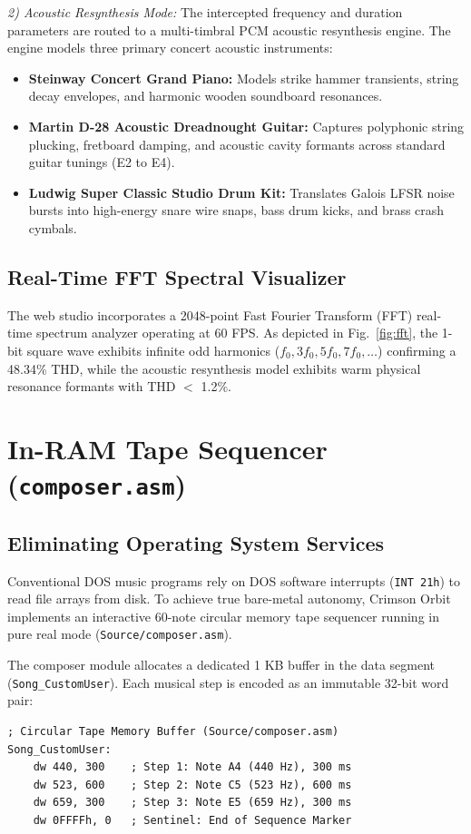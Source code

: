 \documentclass[conference]{IEEEtran}
\begin{document}
\textit{2) Acoustic Resynthesis Mode:} The intercepted frequency and duration parameters are routed to a multi-timbral PCM acoustic resynthesis engine. The engine models three primary concert acoustic instruments:
\begin{itemize}
\item \textbf{Steinway Concert Grand Piano:} Models strike hammer transients, string decay envelopes, and harmonic wooden soundboard resonances.
\item \textbf{Martin D-28 Acoustic Dreadnought Guitar:} Captures polyphonic string plucking, fretboard damping, and acoustic cavity formants across standard guitar tunings (E2 to E4).
\item \textbf{Ludwig Super Classic Studio Drum Kit:} Translates Galois LFSR noise bursts into high-energy snare wire snaps, bass drum kicks, and brass crash cymbals.
\end{itemize}

\subsection{Real-Time FFT Spectral Visualizer}
The web studio incorporates a 2048-point Fast Fourier Transform (FFT) real-time spectrum analyzer operating at 60 FPS. As depicted in Fig.~\ref{fig:fft}, the 1-bit square wave exhibits infinite odd harmonics ($f_0, 3f_0, 5f_0, 7f_0, \dots$) confirming a 48.34\% THD, while the acoustic resynthesis model exhibits warm physical resonance formants with THD $<$ 1.2\%.

\section{In-RAM Tape Sequencer (\texttt{composer.asm})}

\subsection{Eliminating Operating System Services}
Conventional DOS music programs rely on DOS software interrupts (\texttt{INT 21h}) to read file arrays from disk. To achieve true bare-metal autonomy, Crimson Orbit implements an interactive 60-note circular memory tape sequencer running in pure real mode (\texttt{Source/composer.asm}).

The composer module allocates a dedicated 1 KB buffer in the data segment (\texttt{Song\_CustomUser}). Each musical step is encoded as an immutable 32-bit word pair:

\begin{lstlisting}[language={[x86masm]Assembler}]
; Circular Tape Memory Buffer (Source/composer.asm)
Song_CustomUser:
    dw 440, 300    ; Step 1: Note A4 (440 Hz), 300 ms
    dw 523, 600    ; Step 2: Note C5 (523 Hz), 600 ms
    dw 659, 300    ; Step 3: Note E5 (659 Hz), 300 ms
    dw 0FFFFh, 0   ; Sentinel: End of Sequence Marker
\end{lstlisting}
\end{document}
